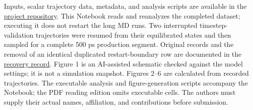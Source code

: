 \documentclass[10pt,a4paper,twocolumn]{article}
\begin{document}
Inputs, scalar trajectory data, metadata, and analysis scripts are available in the \href{https://github.com/Gytid8/copper-thermal-expansion}{project repository}. This Notebook reads and reanalyzes the completed dataset; executing it does not restart the long MD runs. Two interrupted timestep-validation trajectories were resumed from their equilibrated states and then sampled for a complete 500 ps production segment. Original records and the removal of an identical duplicated restart-boundary row are documented in the \href{https://github.com/Gytid8/copper-thermal-expansion/blob/main/docs/recovery_record.md}{recovery record}. Figure 1 is an AI-assisted schematic checked against the model settings; it is not a simulation snapshot. Figures 2–6 are calculated from recorded trajectories. The executable analysis and figure-generation scripts accompany the Notebook; the PDF reading edition omits executable cells. The authors must supply their actual names, affiliation, and contributions before submission.
\end{document}
